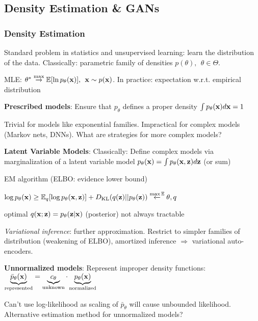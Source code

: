 \subsection{Density Estimation \& GANs}
\label{sub:densityestimationandgams}

\subsubsection{Density Estimation}
\label{ssub:densityestimation}

Standard problem in statistics and unsupervised learning: learn the distribution of the data. Classically: parametric family of densities $p(\theta),\>\>\theta\in\Theta$.

MLE: $\theta^* \overset{\text{max}}{\xrightarrow{}} \mathbb E \lbrack \ln p_\theta (\mathbf x) \rbrack,\>\> \mathbf x\sim p(\mathbf x)$. In practice: expectation w.r.t. empirical distribution

\textbf{Prescribed models}: Ensure that $p_\theta$ defines a proper density $\int p_\theta(\mathbf x)d\mathbf x=1$

Trivial for models like exponential families. Impractical for complex models (Markov nets, DNNs). What are strategies for more complex models?

\textbf{Latent Variable Models}:
Classically: Define complex models via marginalization of a latent variable model
\tab $p_\theta(\mathbf x)=\int p_\theta(\mathbf x,\mathbf z)d\mathbf z$ (or sum)

EM algorithm (ELBO: evidence lower bound)

\tab $\log p_\theta(\mathbf x)\geq \mathbb E_{q} \lbrack \log p_\theta (\mathbf x,\mathbf z) \rbrack +D_{\text{KL}}(q(\mathbf z)||p_\theta(\mathbf z)) \overset{\max\mathbb E}{\xleftarrow{}}\theta,q$

\tab optimal $q(\mathbf x;\mathbf z)=p_\theta(\mathbf z|\mathbf x)$ (posterior) not always tractable

\emph{Variational inference}: further approximation. Restrict to simpler families of distribution (weakening of ELBO), amortized inference $\Rightarrow$ variational auto-encoders.

\textbf{Unnormalized models}: Represent improper density functions:\\ \tab$\underbrace{\bar{p}_\theta(\mathbf x)}_\text{represented}=\underbrace{c_\theta}_\text{unknown}\cdot \underbrace{p_\theta(\mathbf x)}_\text{normalized}$

Can't use log-likelihood as scaling of $\bar{p}_\theta$ will cause unbounded likelihood. Alternative estimation method for unnormalized models?

